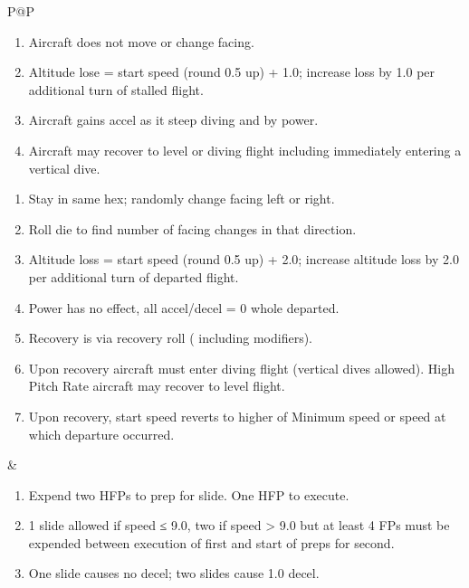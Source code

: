 \begin{twocolumntablefloat}
\begin{twocolumntable}
\begin{tabularx}{\linewidth}{P@{\hspace{1em}}P}

            \begin{enumerate}[nosep]
                \item Aircraft does not move or change facing.
                \item Altitude lose = start speed (round 0.5 up) + 1.0; increase loss by 1.0 per additional turn of stalled flight.
                \item Aircraft gains accel as it steep diving and by power.
                \item Aircraft may recover to level or diving flight including immediately entering a vertical dive.
            \end{enumerate}


            \begin{enumerate}[nosep]
                \item Stay in same hex; randomly change facing left or right.
                \item Roll die to find number of facing changes in that direction.
                \item Altitude loss = start speed (round 0.5 up) + 2.0; increase altitude loss by 2.0 per additional turn of departed flight.
                \item Power has no effect, all accel/decel = 0 whole departed.
                \item Recovery is via recovery roll ( including modifiers).
                \item Upon recovery aircraft must enter diving flight (vertical dives allowed). High Pitch Rate aircraft may recover to level flight.
                \item Upon recovery, start speed reverts to higher of Minimum speed or speed at which departure occurred.
            \end{enumerate}

            &



            \begin{enumerate}[nosep]
                \item Expend two HFPs to prep for slide. One HFP to execute.
                \item 1 slide allowed if speed ≤ 9.0, two if speed > 9.0 but at least 4 FPs must be expended between execution of first and start of preps for second.
                \item One slide causes no decel; two slides cause 1.0 decel.
            \end{enumerate}


\end{tabularx}
\end{twocolumntable}
\end{twocolumntablefloat}

